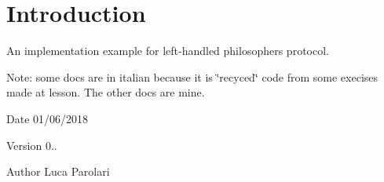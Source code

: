 \hypertarget{index_intro}{}\section{Introduction}\label{index_intro}
An implementation example for left-\/handled philosophers protocol.

Note\+: some docs are in italian because it is \char`\"{}recyced\char`\"{} code from some execises made at lesson. The other docs are mine. \begin{DoxyDate}{Date}
01/06/2018 
\end{DoxyDate}
\begin{DoxyVersion}{Version}
0.. 
\end{DoxyVersion}
\begin{DoxyAuthor}{Author}
Luca Parolari 
\end{DoxyAuthor}
